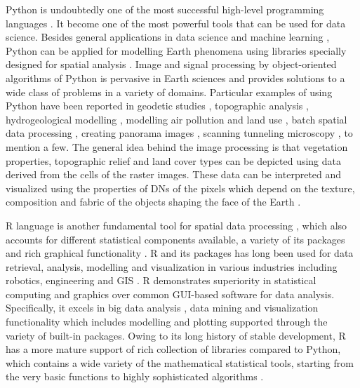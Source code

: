 \documentclass[algorithms,article,submit,pdftex,moreauthors]{Definitions/mdpi}
\begin{document}
Python is undoubtedly one of the most successful high-level programming languages \cite{van1995python}. It become one of the most powerful tools that can be used for data science. Besides general applications in data science and machine learning \cite{8757088,DebeirDecaestecker,Debeir2008,9719489}, Python can be applied for modelling Earth phenomena using libraries specially designed for spatial analysis \cite{Ahmed}. Image and signal processing by object-oriented algorithms of Python is pervasive in Earth sciences and provides solutions to a wide class of problems in a variety of domains. Particular examples of using Python have been reported in geodetic studies \cite{Zhou2021GPS2spaceAO}, topographic analysis \cite{9254627}, hydrogeological modelling \cite{Mogaji}, modelling air pollution and land use \cite{Maetal2020}, batch spatial data processing \cite{6057428}, creating panorama images \cite{JASKOLKA2019e02560}, scanning tunneling microscopy \cite{BASTIDAS2021150821}, to mention a few. The general idea behind the image processing is that vegetation properties, topographic relief and land cover types can be depicted using data derived from the cells of the raster images. These data can be interpreted and visualized using the properties of DNs of the pixels which depend on the texture, composition and fabric of the objects shaping the face of the Earth \cite{YUAN2022106966}. 

R language is another fundamental tool for spatial data processing \cite{RCoreTeam}, which also accounts for different statistical components available, a variety of its packages and rich graphical functionality \cite{Murrell}. R and its packages has long been used for data retrieval, analysis, modelling and visualization in various industries including robotics, engineering and GIS \cite{7847824,Lemenkova2022a,9378399,Lemenkova202216,9390011}. R demonstrates superiority in statistical computing and graphics over common GUI-based software for data analysis. Specifically, it excels in big data analysis \cite{7570960,9752002,6597171}, data mining \cite{7978404} and visualization functionality \cite{Lemenkova201991} which includes modelling and plotting supported through the variety of built-in packages. Owing to its long history of stable development, R has a more mature support of rich collection of libraries compared to Python, which contains a wide variety of the mathematical statistical tools, starting from the very basic functions to highly sophisticated algorithms \cite{9675988}. 
\end{document}
